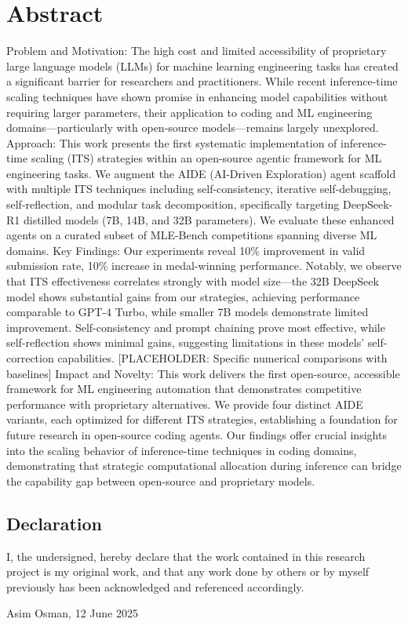 \chapter*{Abstract}


Problem and Motivation: The high cost and limited accessibility of proprietary large language models (LLMs) for machine learning engineering tasks has created a significant barrier for researchers and practitioners. While recent inference-time scaling techniques have shown promise in enhancing model capabilities without requiring larger parameters, their application to coding and ML engineering domains—particularly with open-source models—remains largely unexplored.
Approach: This work presents the first systematic implementation of inference-time scaling (ITS) strategies within an open-source agentic framework for ML engineering tasks. We augment the AIDE (AI-Driven Exploration) agent scaffold with multiple ITS techniques including self-consistency, iterative self-debugging, self-reflection, and modular task decomposition, specifically targeting DeepSeek-R1 distilled models (7B, 14B, and 32B parameters). We evaluate these enhanced agents on a curated subset of MLE-Bench competitions spanning diverse ML domains.
Key Findings: Our experiments reveal 10\% improvement in valid submission rate, 10\% increase in medal-winning performance. Notably, we observe that ITS effectiveness correlates strongly with model size—the 32B DeepSeek model shows substantial gains from our strategies, achieving performance comparable to GPT-4 Turbo, while smaller 7B models demonstrate limited improvement. Self-consistency and prompt chaining prove most effective, while self-reflection shows minimal gains, suggesting limitations in these models' self-correction capabilities. [PLACEHOLDER: Specific numerical comparisons with baselines]
Impact and Novelty: This work delivers the first open-source, accessible framework for ML engineering automation that demonstrates competitive performance with proprietary alternatives. We provide four distinct AIDE variants, each optimized for different ITS strategies, establishing a foundation for future research in open-source coding agents. Our findings offer crucial insights into the scaling behavior of inference-time techniques in coding domains, demonstrating that strategic computational allocation during inference can bridge the capability gap between open-source and proprietary models.
\vfill

\section*{Declaration}

I, the undersigned, hereby declare that the work contained in this research project is my original work, and that any work done by others or by myself previously has been acknowledged and referenced accordingly.

Asim Osman, 12 June 2025